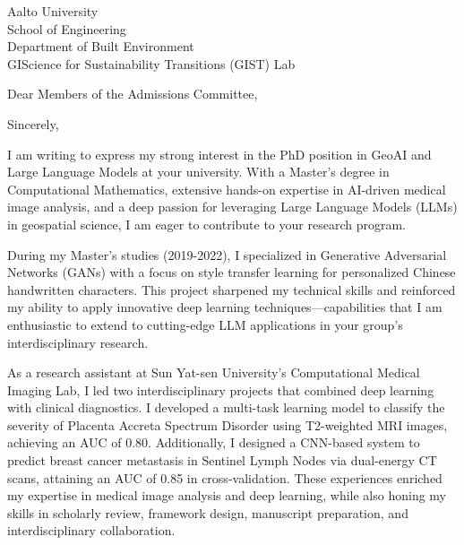 \documentclass[10pt,a4paper,roman]{moderncv}
\begin{document}
\vspace{-4em}
{
Aalto University\\
School of Engineering\\
Department of Built Environment\\
GIScience for Sustainability Transitions (GIST) Lab
}
\date{\today}
\opening{Dear Members of the Admissions Committee,}
\closing{Sincerely,}
\makelettertitle
\thispagestyle{empty}
\pagestyle{empty}
I am writing to express my strong interest in the PhD position in 
GeoAI and Large Language Models at your university. 
With a Master's degree in Computational Mathematics, 
extensive hands-on expertise in AI-driven medical image analysis, 
and a deep passion for leveraging Large Language Models (LLMs) in geospatial science, 
I am eager to contribute to your research program.

During my Master's studies (2019-2022), 
I specialized in Generative Adversarial Networks (GANs) with a focus on style transfer learning 
for personalized Chinese handwritten characters. 
This project sharpened my technical skills and reinforced my ability 
to apply innovative deep learning techniques—capabilities that I am enthusiastic 
to extend to cutting-edge LLM applications in your group's interdisciplinary research.

As a research assistant at Sun Yat-sen University's Computational Medical Imaging Lab, 
I led two interdisciplinary projects that combined deep learning with clinical diagnostics. 
I developed a multi-task learning model 
to classify the severity of Placenta Accreta Spectrum Disorder using T2-weighted MRI images, 
achieving an AUC of 0.80. 
Additionally, I designed a CNN-based system 
to predict breast cancer metastasis in Sentinel Lymph Nodes via dual-energy CT scans, 
attaining an AUC of 0.85 in cross-validation. 
These experiences enriched my expertise in medical image analysis and deep learning, 
while also honing my skills in scholarly review, 
framework design, manuscript preparation, and interdisciplinary collaboration.
\end{document}
